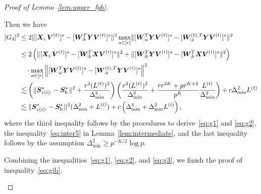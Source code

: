 \documentclass[lettersize,journal]{IEEEtran}
\theoremstyle{definition}
\theoremstyle{definition}
\newcommand{\of}[1]{\left(#1\right)}
\begin{document}
\begin{proof}[Proof of Lemma~\ref{lem:upper_fgh}]
\begin{enumerate}
        
   Then we have 
    \begin{align}
        |G_3|^2 & \leq 2 \onormSize{}{[\mX_{i:} \mV^{(t)}]^s  -  [  \mW_{:b}^T \mY \mV^{(t)} ]^s}^2 \max_{a \in [r]} \onormSize{}{ [  \mW_{:a}^T \mY \mV^{(t)} ]^s -  [   \mW_{:a}^{(t),T} \mY \mV^{(t)}  ]^s}^2 \\
        & \leq 2 \of{ \onormSize{}{[\mX_{i:} \mV^{(t)}]^s  -  [  \mW_{:b}^T \mX \mV^{(t)} ]^s}^2  +  \onormSize{}{ [  \mW_{:b}^T \mY \mV^{(t)} ]^s  -  [  \mW_{:b}^T \mX \mV^{(t)} ]^s}^2  } \\
        & \quad \cdot \max_{a \in [r]} \onorm{ [  \mW_{:a}^T \mY \mV^{(t)} ]^s -  [   \mW_{:a}^{(t),T} \mY \mV^{(t)}  ]^s}^2\\
        & \lesssim \of{\onormSize{}{\mS_{z(i):}^s - \mS_{b:}^s}^2 + \frac{r^2 (L^{(t)})^2}{\Delta_{\min}^2} } \of{ \frac{r^2(L^{(t)})^2}{ \Delta_{\min}^2} + \frac{r r^{2K} + pr^{K+2}}{p^{K}} \frac{L^{(t)}}{\Delta_{\min}^2}}+ c \Delta_{\min}^2 L^{(t)} \\
        & \lesssim \onormSize{}{\mS_{z(i):}^s - \mS_{b:}^s}^2 (\Delta_{\min}^2 + L^{(t)}) + c\of{\Delta_{\min}^4 +  \Delta_{\min}^2 L^{(t)}},\label{eq:g3}
    \end{align}
    where the third inequality follows by the procedures to derive~\eqref{eq:g1} and \eqref{eq:g2}, the inequality~\eqref{eq:inter5} in Lemma~\ref{lem:intermediate}, and the last inequality follows by the assumption $\Delta_{\min}^2 \geq p^{-K/2} \log p$.
    
    Combining the inequalities~\eqref{eq:g1}, \eqref{eq:g2}, and \eqref{eq:g3}, we finish the proof of inequality~\eqref{eq:gib}.
    

\end{enumerate}
\end{proof}
\end{document}
